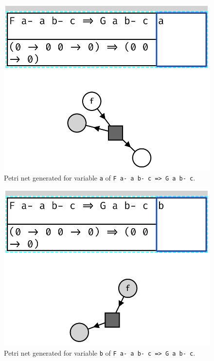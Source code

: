 \documentclass[11pt,openright,hidelinks,a4paper]{article}
\begin{document}
\begin{figure}[H]
\begin{center}
\includegraphics[scale=0.45]{typea}
\end{center}
\caption{Petri net generated for variable \lstinline{a} of \lstinline{F a- a b- c => G a b- c}.}
\label{fig:typea}
\end{figure}

\begin{figure}[H]
\begin{center}
\includegraphics[scale=0.45]{typeb}
\end{center}
\caption{Petri net generated for variable \lstinline{b} of \lstinline{F a- a b- c => G a b- c}.}
\label{fig:typeb}
\end{figure}
\end{document}
